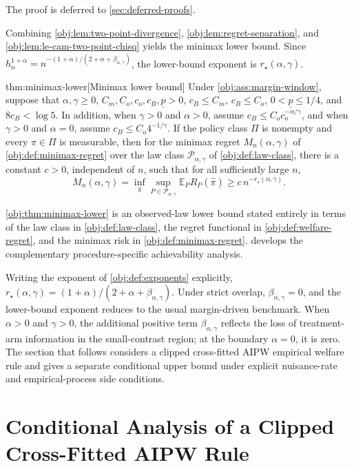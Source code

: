 \documentclass[11pt]{article}
\begin{document}
The proof is deferred to \cref{sec:deferred-proofs}.

Combining \cref{obj:lem:two-point-divergence}, \cref{obj:lem:regret-separation}, and \cref{obj:lem:le-cam-two-point-chisq} yields the minimax lower bound.  Since \(h_n^{1+\alpha}=n^{-(1+\alpha)/(2+\alpha+\beta_{\alpha,\gamma})}\), the lower-bound exponent is \(r_\star(\alpha,\gamma)\).

\begin{theoremv}{thm:minimax-lower}[Minimax lower bound]
Under \cref{obj:ass:margin-window}, suppose that \(\alpha,\gamma\ge0\), \(C_m,C_o,c_o,c_B,\underline p>0\), \(c_B\le C_m\), \(c_B\le C_o\), \(0<\underline p\le 1/4\), and \(8c_B<\log 5\).  In addition, when \(\gamma>0\) and \(\alpha>0\), assume \(c_B\le C_o c_o^{-\alpha/\gamma}\), and when \(\gamma>0\) and \(\alpha=0\), assume \(c_B\le C_o 4^{-1/\gamma}\).  If the policy class \(\Pi\) is nonempty and every \(\pi\in\Pi\) is measurable, then for the minimax regret \(M_n(\alpha,\gamma)\) of \cref{obj:def:minimax-regret} over the law class \(\mathcal P_{\alpha,\gamma}\) of \cref{obj:def:law-class}, there is a constant \(c>0\), independent of \(n\), such that for all sufficiently large \(n\),
\[
M_n(\alpha,\gamma)
=
\inf_{\widehat\pi}
\sup_{P\in\mathcal P_{\alpha,\gamma}}
\mathbb E_P R_P(\widehat\pi)
\ge
c\,n^{-r_\star(\alpha,\gamma)}.
\]
\end{theoremv}

\cref{obj:thm:minimax-lower} is an observed-law lower bound stated entirely in terms of the law class in \cref{obj:def:law-class}, the regret functional in \cref{obj:def:welfare-regret}, and the minimax risk in \cref{obj:def:minimax-regret}.   develops the complementary procedure-specific achievability analysis.

Writing the exponent of \cref{obj:def:exponents} explicitly, \(r_\star(\alpha,\gamma)=(1+\alpha)/(2+\alpha+\beta_{\alpha,\gamma})\).  Under strict overlap, \(\beta_{\alpha,\gamma}=0\), and the lower-bound exponent reduces to the usual margin-driven benchmark.  When \(\alpha>0\) and \(\gamma>0\), the additional positive term \(\beta_{\alpha,\gamma}\) reflects the loss of treatment-arm information in the small-contrast region; at the boundary \(\alpha=0\), it is zero.  The section that follows considers a clipped cross-fitted AIPW empirical welfare rule and gives a separate conditional upper bound under explicit nuisance-rate and empirical-process side conditions.


\section{Conditional Analysis of a Clipped Cross-Fitted AIPW Rule}
\end{document}
